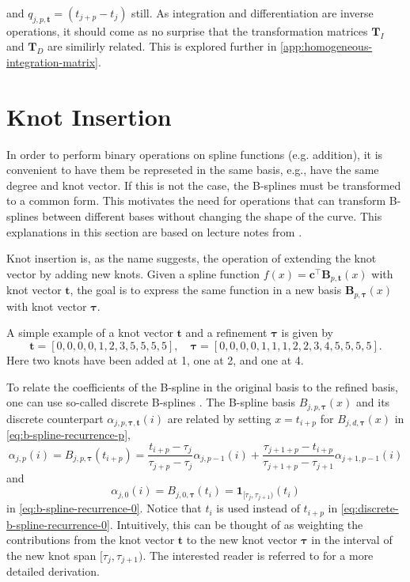 and $q_{j,p,\mathbf{t}} = (t_{j+p}-t_j)$ still.
As integration and differentiation are inverse operations, it should come as no surprise that the transformation matrices $\mathbf T_I$ and $\mathbf T_D$ are similirly related. This is explored further in \cref{app:homogeneous-integration-matrix}.


\section{Knot Insertion}
In order to perform binary operations on spline functions (e.g. addition), it is convenient to have them be represeted in the same basis, e.g., have the same degree and knot vector. If this is not the case, the B-splines must be transformed to a common form. This motivates the need for operations that can transform B-splines between different bases without changing the shape of the curve. This explanations in this section are based on lecture notes from \cite{bspline-uio}.

Knot insertion is, as the name suggests, the operation of extending the knot vector by adding new knots. Given a spline function $f(x) = \mathbf{c}^{\top} \mathbf{B}_{p, \mathbf{t}}(x)$ with knot vector $\mathbf t$, the goal is to express the same function in a new basis $\mathbf{B}_{p, \boldsymbol{\tau}}(x)$ with knot vector $\boldsymbol{\tau}$.

A simple example of a knot vector $\mathbf t$ and a refinement $\boldsymbol \tau$ is given by
$$
    \mathbf t = [0, 0, 0, 0, 1, 2, 3, 5, 5, 5, 5], \quad \boldsymbol \tau = [0, 0, 0, 0, 1, 1, 1, 2, 2, 3, 4, 5, 5, 5, 5].
$$
Here two knots have been added at 1, one at 2, and one at 4.

To relate the coefficients of the B-spline in the original basis to the refined basis, one can use so-called discrete B-splines \citep{Cohen1980}.  The B-spline basis $B_{j, p, \boldsymbol{\tau}}(x)$ and its discrete counterpart $\alpha_{j,p, \boldsymbol{\tau}, \mathbf t}(i)$ are related by setting $x = t_{i+p}$ for $B_{j, d, \boldsymbol{\tau}}(x)$ in \cref{eq:b-spline-recurrence-p}, 
\begin{equation}\label{eq:discrete-b-spline-recurrence-p}
    \alpha_{j,p}(i) = B_{j, p, \boldsymbol{\tau}}(t_{i+p}) = 
    \frac{t_{i+p}-\tau_j}{\tau_{j+p}-\tau_j} \alpha_{j,p-1}(i) + \frac{\tau_{j+1+p}-t_{i+p}}{\tau_{j+1+p}-\tau_{j+1}} \alpha_{j+1,p-1}(i)
\end{equation}
and 
\begin{equation}\label{eq:discrete-b-spline-recurrence-0}
\alpha_{j,0}(i) = B_{j, 0, \boldsymbol{\tau}}(t_{i}) = \mathbf 1_{[\tau_j, \tau_{j+1})}(t_{i})
\end{equation}
 in \cref{eq:b-spline-recurrence-0}. Notice that $t_i$ is used instead of $t_{i+p}$ in \cref{eq:discrete-b-spline-recurrence-0}. Intuitively, this can be thought of as weighting the contributions from the knot vector $\mathbf t$ to the new knot vector $\boldsymbol \tau$ in the interval of the new knot span $[\tau_j, \tau_{j+1})$. The interested reader is referred to \cite{bspline-uio} for a more detailed derivation.

